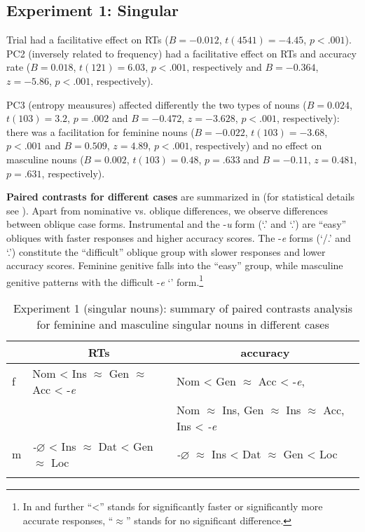 \documentclass[output=paper, modfonts,newtxmath,hidelinks]{langscibook}
\begin{document}
\subsection{Experiment 1: Singular}

Trial had a facilitative effect on RTs ($B=-0.012$, $t(4541)=-4.45$, $p<.001$). PC2 (inversely related to frequency) had a facilitative effect on RTs and accuracy rate ($B= 0.018$, $t(121)= 6.03$, $p< .001$, respectively and $B= -0.364$, $z= -5.86$, $p< .001$, respectively). 

PC3 (entropy meausures) affected differently the two types of nouns ($B= 0.024$, $t(103)= 3.2$, $p= .002$ and $B= -0.472$, $z= -3.628$, $p< .001$, respectively):  there was a facilitation for feminine nouns ($B= -0.022$, $t(103)= -3.68$, $p< .001$ and $B= 0.509$, $z= 4.89$, $p< .001$, respectively) and no effect on masculine nouns ($B= 0.002$, $t(103)= 0.48$, $p= .633$ and $B= -0.11$, $z= 0.481$, $p= .631$, respectively).

\textbf{Paired contrasts for different cases} are summarized in  (for statistical details see ). Apart from nominative vs. oblique differences, we observe differences between oblique case forms. Instrumental and the -\textit{u} form (`\accc.\fem' and `\datt.\masc') are ``easy'' obliques with faster responses and higher accuracy scores. The -\textit{e} forms (`\datt/\locc.\fem' and `\locc.\masc') constitute the ``difficult'' oblique group with slower responses and lower accuracy scores. Feminine genitive falls into the ``easy'' group, while masculine genitive patterns with the difficult -\textit{e} `\locc' form.\footnote{In  and further ``<'' stands for significantly faster or significantly more accurate responses, ``$\approx$'' stands for no significant difference.}

\begin{table}
	\caption{Experiment 1 (singular nouns): summary of paired contrasts analysis for feminine and masculine singular nouns in different cases}
    \label{tab:caseSgHierarchy}
    \begin{tabular}{*{3}l}
    \lsptoprule
    ~	&	\multicolumn{1}{c}{RTs}	&	\multicolumn{1}{c}{accuracy}\\
    \midrule
    f	&	Nom < Ins $\approx$ Gen $\approx$ Acc < -\textit{e}	&	Nom < Gen $\approx$ Acc < -\textit{e}, \\
    ~	&	~	&	Nom $\approx$ Ins, Gen $\approx$ Ins $\approx$ Acc, Ins < \textit{-e}\\
    m	&	\textit{-$\varnothing$} < Ins $\approx$ Dat < Gen $\approx$ Loc	&	\textit{-$\varnothing$} $\approx$ Ins < Dat $\approx$ Gen  < Loc			\\
    \lspbottomrule
    \end{tabular}
\end{table}
\end{document}
